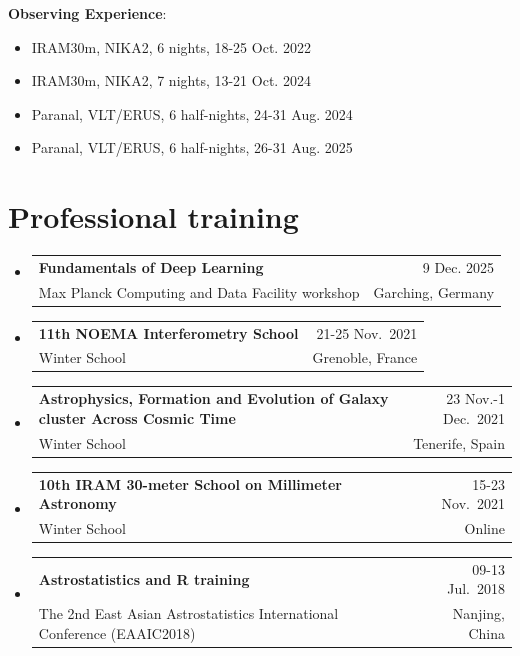\documentclass[A4,11pt]{article}
\makeatletter
\newcommand{\CVSubheading}[4]{
  \vspace{-2pt}\item
    \begin{tabular*}{0.97\textwidth}[t]{l@{\extracolsep{\fill}}r}
      \textbf{#1} & #2 \\
      \small#3 & \small #4 \\
    \end{tabular*}\vspace{-7pt}
}
\newcommand{\CVSubHeadingListStart}{\begin{itemize}[leftmargin=0.5cm, label={}]}
\newcommand{\CVSubHeadingListEnd}{\end{itemize}}
\newenvironment{paperlist}
{ \begin{itemize}[leftmargin=0.8cm, label={$\bullet$}]
    \setlength{\itemsep}{1pt}
    \setlength{\parskip}{1pt}
    \setlength{\parsep}{1pt}     }
{ \end{itemize}                  }
\makeatother
\begin{document}
\textbf{Observing Experience}:\\
\vspace{-0.8em}
\begin{paperlist}
    \item IRAM30m, NIKA2, 6 nights, 18-25 Oct. 2022
    \item IRAM30m, NIKA2, 7 nights, 13-21 Oct. 2024
    \item Paranal, VLT/ERUS, 6 half-nights, 24-31 Aug. 2024
    \item Paranal, VLT/ERUS, 6 half-nights, 26-31 Aug. 2025
\end{paperlist}

\section{Professional training}
  \CVSubHeadingListStart
    \CVSubheading
      {Fundamentals of Deep Learning}{9 Dec. 2025}
      {Max Planck Computing and Data Facility workshop}{Garching, Germany}
    \CVSubheading
      {11th NOEMA Interferometry School}{21-25 Nov.~2021}
      {Winter School}{Grenoble, France}
    \CVSubheading 
      {Astrophysics, Formation and Evolution of Galaxy cluster Across Cosmic Time}{23 Nov.-1 Dec.~2021}
      {Winter School}{Tenerife, Spain}
    \CVSubheading 
      {10th IRAM 30-meter School on Millimeter Astronomy}{15-23 Nov.~2021}
      {Winter School}{Online}
    \CVSubheading
      {Astrostatistics and R training}{09-13 Jul.~2018}
      {The 2nd East Asian Astrostatistics International Conference (EAAIC2018)}{Nanjing, China}
  \CVSubHeadingListEnd
\end{document}
